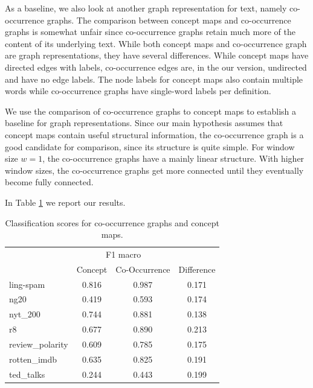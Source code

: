 
As a baseline, we also look at another graph representation for text, namely co-occurrence graphs.
The comparison between concept maps and co-occurrence graphs is somewhat unfair since co-occurrence graphs retain much more of the content of its underlying text.
While both concept maps and co-occurrence graph are graph representations, they have several differences. While concept maps have directed edges with labels, co-occurrence edges are, in the our version, undirected and have no edge labels.
The node labels for concept maps also contain multiple words while co-occurrence graphs have single-word labels per definition.

We use the comparison of co-occurrence graphs to concept maps to establish a baseline for graph representations.
Since our main hypothesis assumes that concept maps contain useful structural information, the co-occurrence graph is a good candidate for comparison, since its structure is quite simple.
For window size $w=1$, the co-occurrence graphs have a mainly linear structure. With higher window sizes, the co-occurrence graphs get more connected until they eventually become fully connected.

In Table \ref{table:comparison_results_cooccurrence} we report our results.


\begin{table}[htb!]
	\centering
	\begin{tabular}{lcc|c}
	\toprule
		{} &  \multicolumn{2}{c}{F1 macro} \\
		& Concept &  Co-Occurrence & Difference \\
		\midrule
			ling-spam       & 0.816 & 0.987 & 0.171 \\
			ng20            & 0.419 & 0.593 & 0.174 \\
			nyt\_200         & 0.744 & 0.881 & 0.138 \\
			r8              & 0.677 & 0.890 & 0.213 \\
			review\_polarity & 0.609 & 0.785 & 0.175 \\
			rotten\_imdb     & 0.635 & 0.825 & 0.191 \\
			ted\_talks       & 0.244 & 0.443 & 0.199 \\
		\bottomrule
	\end{tabular}
	\caption[Results: Co-Occurrence vs. Concept Maps]{Classification scores for co-occurrence graphs and concept maps.}\label{table:comparison_results_cooccurrence}
\end{table}

